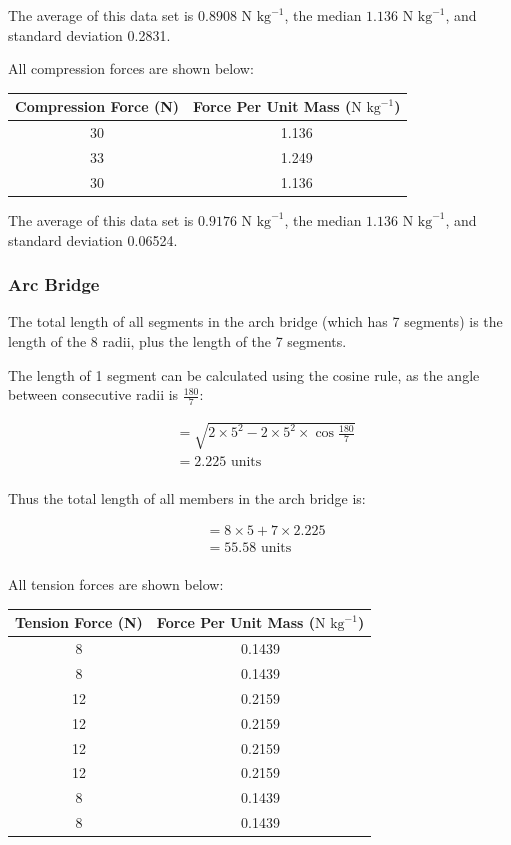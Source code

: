 \documentclass[a4paper,11pt]{article}
\begin{document}
The average of this data set is $0.8908\mbox{ N kg}^{-1}$, the median
$1.136\mbox{ N kg}^{-1}$, and standard deviation 0.2831.

All compression forces are shown below:

\begin{center}
\begin{tabular}{|c|c|}
\hline
Compression Force (N) & Force Per Unit Mass ($\mbox{N kg}^{-1}$) \\
\hline
30 & 1.136 \\
33 & 1.249 \\
30 & 1.136 \\
\hline
\end{tabular}
\end{center}

The average of this data set is $0.9176\mbox{ N kg}^{-1}$, the median
$1.136\mbox{ N kg}^{-1}$, and standard deviation 0.06524.


\subsubsection{Arc Bridge}

The total length of all segments in the arch bridge (which has 7 segments) is
the length of the 8 radii, plus the length of the 7 segments.

The length of 1 segment can be calculated using the cosine rule, as the angle
between consecutive radii is $\frac{180}{7}$:

$$
\begin{aligned}
& = \sqrt{2 \times 5^2 - 2 \times 5^2 \times \cos{\frac{180}{7}}} \\
& = 2.225\mbox{ units} \\
\end{aligned}
$$

Thus the total length of all members in the arch bridge is:

$$
\begin{aligned}
& = 8 \times 5 + 7 \times 2.225 \\
& = 55.58\mbox{ units} \\
\end{aligned}
$$

All tension forces are shown below:

\begin{center}
\begin{tabular}{|c|c|}
\hline
Tension Force (N) & Force Per Unit Mass ($\mbox{N kg}^{-1}$) \\
\hline
8 & 0.1439 \\
8 & 0.1439 \\
12 & 0.2159 \\
12 & 0.2159 \\
12 & 0.2159 \\
12 & 0.2159 \\
8 & 0.1439 \\
8 & 0.1439 \\
\hline
\end{tabular}
\end{center}
\end{document}

